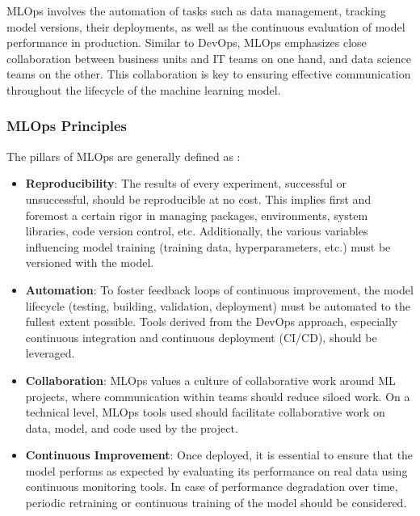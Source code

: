 MLOps involves the automation of tasks such as data management, tracking model versions, their deployments, as well as the continuous evaluation of model performance in production. Similar to DevOps, MLOps emphasizes close collaboration between business units and IT teams on one hand, and data science teams on the other. This collaboration is key to ensuring effective communication throughout the lifecycle of the machine learning model.

\subsubsection{MLOps Principles}

The pillars of MLOps\cite{kreuzberger2023machine} are generally defined as :

\begin{itemize}
    \item \textbf{Reproducibility}: The results of every experiment, successful or unsuccessful, should be reproducible at no cost. This implies first and foremost a certain rigor in managing packages, environments, system libraries, code version control, etc. Additionally, the various variables influencing model training (training data, hyperparameters, etc.) must be versioned with the model.
    
    \item \textbf{Automation}: To foster feedback loops of continuous improvement, the model lifecycle (testing, building, validation, deployment) must be automated to the fullest extent possible. Tools derived from the DevOps approach, especially continuous integration and continuous deployment (CI/CD), should be leveraged.
    
    \item \textbf{Collaboration}: MLOps values a culture of collaborative work around ML projects, where communication within teams should reduce siloed work. On a technical level, MLOps tools used should facilitate collaborative work on data, model, and code used by the project.
    
    \item \textbf{Continuous Improvement}: Once deployed, it is essential to ensure that the model performs as expected by evaluating its performance on real data using continuous monitoring tools. In case of performance degradation over time, periodic retraining or continuous training of the model should be considered.
\end{itemize}


